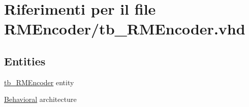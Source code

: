 \hypertarget{tb___r_m_encoder_8vhd}{\section{Riferimenti per il file R\+M\+Encoder/tb\+\_\+\+R\+M\+Encoder.vhd}
\label{tb___r_m_encoder_8vhd}
}
\subsection*{Entities}
\begin{DoxyCompactItemize}
\item 
\hyperlink{classtb___r_m_encoder}{tb\+\_\+\+R\+M\+Encoder} entity
\item 
\hyperlink{classtb___r_m_encoder_1_1_behavioral}{Behavioral} architecture
\end{DoxyCompactItemize}
